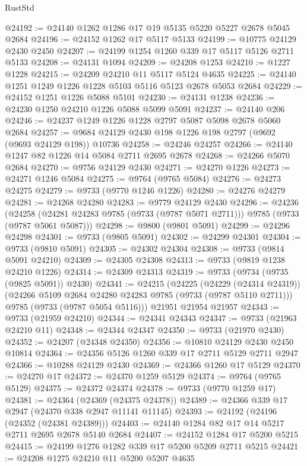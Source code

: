 \begin{lexlean}{RustStd}
\begin{coremodule}
{\begin{coremodule}
{{{{{{{{{{{{{{{{{{{{{{{{{{{{{{{{{{{{{{{{{{{{{{{{{{{{{{{@24192 := @24140 @1262 @1286 @17 @19 @5135 @5220 @5227 @2678 @5045 @2684
@24196 := @24152 @1262 @17 @5117 @5133
@24199 := @10775 @24129 @2430 @2450
@24207 := @24199 @1254 @1260 @339 @17 @5117 @5126 @2711 @5133
@24208 := @24131 @1094
@24209 := @24208 @1253
@24210 := @1227 @1228
@24215 := @24209 @24210 @11 @5117 @5124 @4635
@24225 := @24140 @1251 @1249 @1226 @1228 @5103 @5116 @5123 @2678 @5053 @2684
@24229 := @24152 @1251 @1226 @5088 @5101
@24230 := @24131 @1238
@24236 := @24230 @1250 @24210 @1226 @5088 @5099 @5091
@24237 := @24140 @206
@24246 := @24237 @1249 @1226 @1228 @2797 @5087 @5098 @2678 @5060 @2684
@24257 := @9684 @24129 @2430 @198 @1226 @198 @2797 (@9692 (@9693 @24129 @198)) @10736
@24258 := @24246 @24257
@24266 := @24140 @1247 @82 @1226 @14 @5084 @2711 @2695 @2678
@24268 := @24266 @5070 @2684
@24270 := @9756 @24129 @2430
@24271 := @24270 @1226
@24273 := @24271 @1246 @5084
@24275 := @9764 (@9765 @5084)
@24276 := @24273 @24275
@24279 := @9733 (@9770 @1246 @1226)
@24280 := @24276 @24279
@24281 := @24268 @24280
@24283 := @9779 @24129 @2430
@24296 := @24236
    (@24258 (@24281 @24283 @9785 (@9733 (@9787 @5071 @2711))) @9785 (@9733 (@9787 @5061 @5087)))
@24298 := @9800 (@9801 @5091)
@24299 := @24296 @24298
@24301 := @9733 (@9805 @5091)
@24302 := @24299 @24301
@24304 := @9733 (@9810 @5091)
@24305 := @24302 @24304
@24308 := @9733 (@9814 @5091 @24210)
@24309 := @24305 @24308
@24313 := @9733 (@9819 @1238 @24210 @1226)
@24314 := @24309 @24313
@24319 := @9733 (@9734 (@9735 (@9825 @5091)) @2430)
@24341 := @24215
    (@24225
      (@24229 (@24314 @24319))
      (@24266 @5109 @2684 @24280 @24283 @9785 (@9733 (@9787 @5110 @2711)))
      @9785
      (@9733 (@9787 @5054 @5116)))
    @21951
    @21954
    @21957
@24343 := @9733 (@21959 @24210)
@24344 := @24341 @24343
@24347 := @9733 (@21963 @24210 @11)
@24348 := @24344 @24347
@24350 := @9733 (@21970 @2430)
@24352 := @24207 (@24348 @24350)
@24356 := @10810 @24129 @2430 @2450 @10814
@24364 := @24356 @5126 @1260 @339 @17 @2711 @5129 @2711 @2947
@24366 := @10288 @24129 @2430
@24369 := @24366 @1260 @17 @5129
@24370 := @24270 @17
@24372 := @24370 @1259 @5129
@24374 := @9764 (@9765 @5129)
@24375 := @24372 @24374
@24378 := @9733 (@9770 @1259 @17)
@24381 := @24364 (@24369 (@24375 @24378))
@24389 := @24366 @339 @17 @2947 (@24370 @338 @2947 @11141 @11145)
@24393 := @24192 (@24196 (@24352 (@24381 @24389)))
@24403 := @24140 @1284 @82 @17 @14 @5217 @2711 @2695 @2678 @5140 @2684
@24407 := @24152 @1284 @17 @5200 @5215
@24415 := @24199 @1276 @1282 @339 @17 @5200 @5209 @2711 @5215
@24421 := @24208 @1275 @24210 @11 @5200 @5207 @4635
}}}}}}}}}}}}}}}}}}}}}}}}}}}}}}}}}}}}}}}}}}}}}}}}}}}}}}}
\end{coremodule}}
\end{coremodule}
\end{lexlean}
